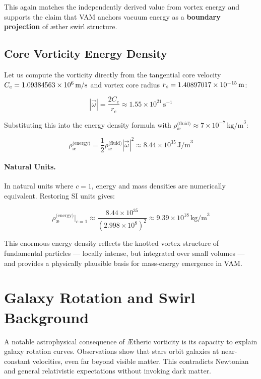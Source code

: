 \documentclass[12pt]{article}
\begin{document}
    This again matches the independently derived value from vortex energy and supports the claim that VAM anchors vacuum energy as a \textbf{boundary projection} of æther swirl structure.

    \subsection{Core Vorticity Energy Density}

    Let us compute the vorticity directly from the tangential core velocity \( C_e = 1.09384563 \times 10^{6} \, \text{m/s} \) and vortex core radius \( r_c = 1.40897017 \times 10^{-15} \, \text{m} \):

    \[
        |\vec{\omega}| = \frac{2 C_e}{r_c} \approx 1.55 \times 10^{21} \, \text{s}^{-1}
    \]

    Substituting this into the energy density formula with \( \rho_{\text{\ae}}^{\text{(fluid)}} \approx 7 \times 10^{-7} \, \text{kg/m}^3 \):

    \[
        \rho_{\text{\ae}}^{\text{(energy)}} = \frac{1}{2} \rho_{\text{\ae}}^{\text{(fluid)}} |\vec{\omega}|^2 \approx 8.44 \times 10^{35} \, \text{J/m}^3
    \]

    \paragraph{Natural Units.}
    In natural units where \( c = 1 \), energy and mass densities are numerically equivalent. Restoring SI units gives:

    \[
        \rho_{\text{\ae}}^{\text{(energy)}} \Big|_{c=1} \approx \frac{8.44 \times 10^{35}}{(2.998 \times 10^8)^2} \approx 9.39 \times 10^{18} \, \text{kg/m}^3
    \]

    This enormous energy density reflects the knotted vortex structure of fundamental particles — locally intense, but integrated over small volumes — and provides a physically plausible basis for mass-energy emergence in VAM.


    \section{Galaxy Rotation and Swirl Background}

    A notable astrophysical consequence of \AE{}theric vorticity is its capacity to explain galaxy rotation curves. Observations show that stars orbit galaxies at near-constant velocities, even far beyond visible matter. This contradicts Newtonian and general relativistic expectations without invoking dark matter.
\end{document}

